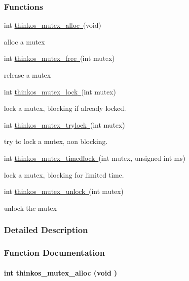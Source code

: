 {\subsubsection{\texorpdfstring{{Functions}}{Functions}}\label{h.1ksv4uv}

{int
}{\protect\hyperlink{h.44sinio}{thinkos\_mutex\_alloc}}{\protect\hyperlink{h.44sinio}{~}}{(void)}

{alloc a mutex }

{int
}{\protect\hyperlink{h.2jxsxqh}{thinkos\_mutex\_free}}{\protect\hyperlink{h.2jxsxqh}{~}}{(int
mutex)}

{release a mutex }

{int
}{\protect\hyperlink{h.z337ya}{thinkos\_mutex\_lock}}{\protect\hyperlink{h.z337ya}{~}}{(int
mutex)}

{lock a mutex, blocking if already locked. }

{int
}{\protect\hyperlink{h.3j2qqm3}{thinkos\_mutex\_trylock}}{\protect\hyperlink{h.3j2qqm3}{~}}{(int
mutex)}

{try to lock a mutex, non blocking. }

{int
}{\protect\hyperlink{h.1y810tw}{thinkos\_mutex\_timedlock}}{\protect\hyperlink{h.1y810tw}{~}}{(int
mutex, unsigned int ms)}

{lock a mutex, blocking for limited time. }

{int
}{\protect\hyperlink{h.4i7ojhp}{thinkos\_mutex\_unlock}}{\protect\hyperlink{h.4i7ojhp}{~}}{(int
mutex)}

{unlock the mutex }

{}

\subsubsection{\texorpdfstring{{Detailed
Description}}{Detailed Description}}\label{detailed-description-2}

{}

{}

\subsubsection{\texorpdfstring{{Function
Documentation}}{Function Documentation}}\label{function-documentation-2}

\paragraph{\texorpdfstring{{int thinkos\_mutex\_alloc (void
)}}{int thinkos\_mutex\_alloc (void )}}\label{int-thinkos_mutex_alloc-void}

}
